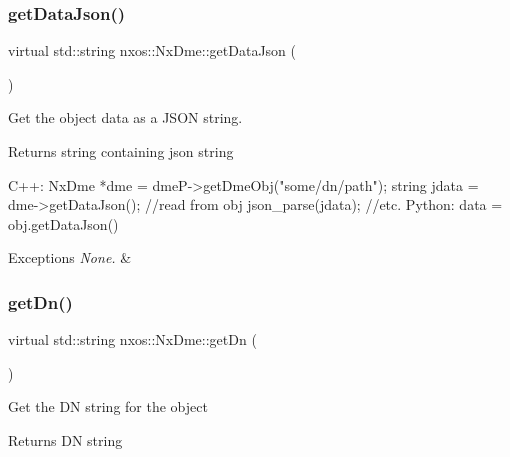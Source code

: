 \subsubsection{\texorpdfstring{get\+Data\+Json()}{getDataJson()}}
{\footnotesize\ttfamily virtual std\+::string nxos\+::\+Nx\+Dme\+::get\+Data\+Json (\begin{DoxyParamCaption}{ }\end{DoxyParamCaption})\hspace{0.3cm}{\ttfamily [pure virtual]}}

Get the object data as a J\+S\+ON string.

\begin{DoxyReturn}{Returns}
string containing json string 
\begin{DoxyCode}
C++:
   NxDme *dme = dmeP->getDmeObj(\textcolor{stringliteral}{"some/dn/path"});
   \textcolor{keywordtype}{string}  jdata = dme->getDataJson(); \textcolor{comment}{//read from obj}
           json\_parse(jdata); \textcolor{comment}{//etc.}
Python:
    data = obj.getDataJson()
\end{DoxyCode}

\end{DoxyReturn}

\begin{DoxyExceptions}{Exceptions}
{\em None.} & \\
\hline
\end{DoxyExceptions}
\mbox{\label{classnxos_1_1_nx_dme_ad97ecb092308dcacdd5de64327742210}} 
\subsubsection{\texorpdfstring{get\+Dn()}{getDn()}}
{\footnotesize\ttfamily virtual std\+::string nxos\+::\+Nx\+Dme\+::get\+Dn (\begin{DoxyParamCaption}{ }\end{DoxyParamCaption})\hspace{0.3cm}{\ttfamily [pure virtual]}}

Get the DN string for the object \begin{DoxyReturn}{Returns}
DN string 

\end{DoxyReturn}

